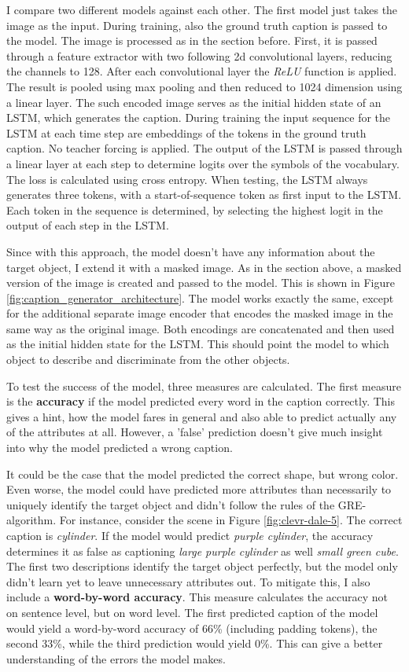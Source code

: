 I compare two different models against each other.
The first model just takes the image as the input.
During training, also the ground truth caption is passed to the model.
The image is processed as in the section before.
First, it is passed through a feature extractor with two following 2d convolutional layers, reducing the channels to 128.
After each convolutional layer the \emph{ReLU} function is applied.
The result is pooled using max pooling and then reduced to 1024 dimension using a linear layer.
The such encoded image serves as the initial hidden state of an LSTM, which generates the caption.
During training the input sequence for the LSTM at each time step are embeddings of the tokens in the ground truth caption.
No teacher forcing is applied.
The output of the LSTM is passed through a linear layer at each step to determine logits over the symbols of the vocabulary.
The loss is calculated using cross entropy.
When testing, the LSTM always generates three tokens, with a start-of-sequence token as first input to the LSTM.
Each token in the sequence is determined, by selecting the highest logit in the output of each step in the LSTM.

Since with this approach, the model doesn't have any information about the target object, I extend it with a masked image.
As in the section above, a masked version of the image is created and passed to the model.
This is shown in Figure \ref{fig:caption_generator_architecture}.
The model works exactly the same, except for the additional separate image encoder that encodes the masked image in the same way as the original image.
Both encodings are concatenated and then used as the initial hidden state for the LSTM.
This should point the model to which object to describe and discriminate from the other objects.

To test the success of the model, three measures are calculated.
The first measure is the \textbf{accuracy} if the model predicted every word in the caption correctly.
This gives a hint, how the model fares in general and also able to predict actually any of the attributes at all.
However, a 'false' prediction doesn't give much insight into why the model predicted a wrong caption.

It could be the case that the model predicted the correct shape, but wrong color.
Even worse, the model could have predicted more attributes than necessarily to uniquely identify the target object and didn't follow the rules of the GRE-algorithm.
For instance, consider the scene in Figure \ref{fig:clevr-dale-5}.
The correct caption is \emph{cylinder}.
If the model would predict \emph{purple cylinder}, the accuracy determines it as false as captioning \emph{large purple cylinder} as well \emph{small green cube}.
The first two descriptions identify the target object perfectly, but the model only didn't learn yet to leave unnecessary attributes out.
To mitigate this, I also include a \textbf{word-by-word accuracy}.
This measure calculates the accuracy not on sentence level, but on word level.
The first predicted caption of the model would yield a word-by-word accuracy of 66\% (including padding tokens), the second 33\%, while the third prediction would
yield 0\%.
This can give a better understanding of the errors the model makes.


